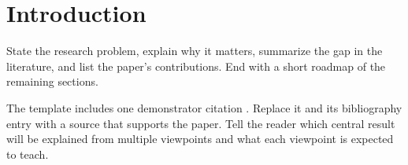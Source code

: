 \section{Introduction}
\label{sec:introduction}

State the research problem, explain why it matters, summarize the gap in the
literature, and list the paper's contributions. End with a short roadmap of the
remaining sections.

The template includes one demonstrator citation \cite{template-reference}.
Replace it and its bibliography entry with a source that supports the paper.
Tell the reader which central result will be explained from multiple
viewpoints and what each viewpoint is expected to teach.
